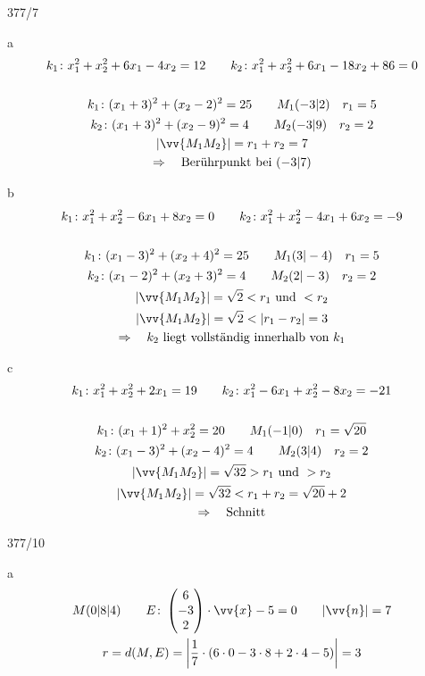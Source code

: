 \begin{exercise}{377/7}
  \item [a]
  \begin{gather*}
    k_1 \colon x_1^2 + x_2^2 + 6x_1 - 4x_2 = 12 \qquad k_2 \colon x_1^2 + x_2^2 + 6x_1 - 18x_2 + 86 = 0 \\\\
    k_1 \colon (x_1 + 3)^2 + (x_2 - 2)^2 = 25 \qquad M_1(-3|2) \quad r_1 = 5 \\
    k_2 \colon (x_1 + 3)^2 + (x_2 - 9)^2 = 4 \qquad M_2(-3|9) \quad r_2 = 2 \\
    |\vv{M_1M_2}| = r_1 + r_2 = 7 \\
    \Rightarrow\quad \text{Berührpunkt bei } (-3|7)
  \end{gather*}
  \item [b]
  \begin{gather*}
    k_1 \colon x_1^2 + x_2^2 - 6x_1 + 8x_2 = 0 \qquad k_2 \colon x_1^2 + x_2^2 - 4x_1 + 6x_2 = -9 \\\\
    k_1 \colon (x_1 - 3)^2 + (x_2 + 4)^2 = 25 \qquad M_1(3|-4) \quad r_1 = 5 \\
    k_2 \colon (x_1 - 2)^2 + (x_2 + 3)^2 = 4 \qquad M_2(2|-3) \quad r_2 = 2 \\
    |\vv{M_1M_2}| = \sqrt{2} < r_1 \text{ und } < r_2 \\
    |\vv{M_1M_2}| = \sqrt{2} < |r_1 - r_2| = 3 \\
    \Rightarrow\quad \text{$k_2$ liegt vollständig innerhalb von $k_1$}
  \end{gather*}
  \item [c]
  \begin{gather*}
    k_1 \colon x_1^2 + x_2^2 + 2x_1 = 19 \qquad k_2 \colon x_1^2 - 6x_1 + x_2^2 - 8x_2 = -21 \\\\
    k_1 \colon (x_1 + 1)^2 + x_2^2 = 20 \qquad M_1(-1|0) \quad r_1 = \sqrt{20} \\
    k_2 \colon (x_1 - 3)^2 + (x_2 - 4)^2 = 4 \qquad M_2(3|4) \quad r_2 = 2 \\
    |\vv{M_1M_2}| = \sqrt{32} > r_1 \text{ und } > r_2 \\
    |\vv{M_1M_2}| = \sqrt{32} < r_1 + r_2 = \sqrt{20} + 2 \\
    \Rightarrow\quad \text{Schnitt}
  \end{gather*}
\end{exercise}
\begin{exercise}{377/10}
  \item [a]
  \begin{gather*}
    M(0|8|4) \qquad E \colon \begin{pmatrix}6 \\ -3 \\ 2\end{pmatrix} \cdot \vv{x} - 5 = 0 \qquad |\vv{n}| = 7 \\
    r = d(M, E) = \left|\frac{1}{7} \cdot (6 \cdot 0 - 3 \cdot 8 + 2 \cdot 4 - 5)\right| = 3
  \end{gather*}
\end{exercise}
